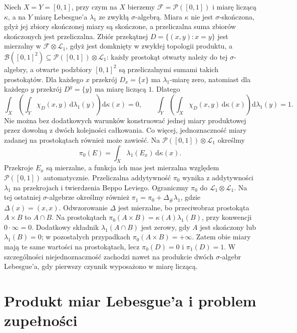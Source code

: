 \begin{przyklad}
\label{ex:non-sigma-tonelli-12}
Niech $X=Y=[0,1]$, przy czym na $X$ bierzemy
$\mathcal F=\mathcal P([0,1])$ i miarę liczącą $\kappa$,
a na $Y$ miarę Lebesgue'a $\lambda_1$ ze zwykłą
$\sigma$-algebrą. Miara $\kappa$ nie jest
$\sigma$-skończona, gdyż jej zbiory skończonej
miary są skończone, a przeliczalna suma zbiorów
skończonych jest przeliczalna.
Zbiór przekątnej $D=\{(x,y):x=y\}$ jest
mierzalny w $\mathcal F\otimes\mathcal L_1$,
gdyż jest domknięty w zwykłej topologii produktu,
a $\mathcal B([0,1]^2)\subseteq\mathcal P([0,1])\otimes\mathcal L_1$:
każdy prostokąt otwarty należy do tej $\sigma$-algebry,
a otwarte podzbiory $[0,1]^2$ są przeliczalnymi sumami
takich prostokątów.
Dla każdego $x$ przekrój $D_x=\{x\}$ ma
$\lambda_1$-miarę zero, natomiast dla każdego $y$
przekrój $D^y=\{y\}$ ma miarę liczącą $1$.
Dlatego
\[
\int_X\left(\int_Y\chi_D(x,y)\,
\mathrm d\lambda_1(y)\right)\mathrm d\kappa(x)=0,
\qquad
\int_Y\left(\int_X\chi_D(x,y)\,
\mathrm d\kappa(x)\right)\mathrm d\lambda_1(y)=1.
\]
Nie można bez dodatkowych warunków konstruować
jednej miary produktowej przez dowolną z dwóch
kolejności całkowania. Co więcej, jednoznaczność
miary zadanej na prostokątach również może zawieść.
Na $\mathcal P([0,1])\otimes\mathcal L_1$ określmy
\[
 \pi_0(E)=\int_X\lambda_1(E_x)\,\mathrm d\kappa(x).
\]
Przekroje $E_x$ są mierzalne, a funkcja ich mas jest
mierzalna względem $\mathcal P([0,1])$ automatycznie.
Przeliczalna addytywność $\pi_0$ wynika z addytywności
$\lambda_1$ na przekrojach i twierdzenia Beppo Leviego.
Ograniczmy $\pi_0$ do $\mathcal L_1\otimes\mathcal L_1$.
Na tej ostatniej $\sigma$-algebrze określmy również
$\pi_1=\pi_0+\Delta_\#\lambda_1$, gdzie $\Delta(x)=(x,x)$.
Odwzorowanie $\Delta$ jest mierzalne, bo przeciwobraz
prostokąta $A\times B$ to $A\cap B$.
Na prostokątach $\pi_0(A\times B)=\kappa(A)\lambda_1(B)$,
przy konwencji $0\cdot\infty=0$.
Dodatkowy składnik $\lambda_1(A\cap B)$ jest zerowy,
gdy $A$ jest skończony lub $\lambda_1(B)=0$;
w pozostałych przypadkach $\pi_0(A\times B)=+\infty$.
Zatem obie miary mają te same wartości na prostokątach,
lecz $\pi_0(D)=0$ i $\pi_1(D)=1$.
W szczególności niejednoznaczność zachodzi nawet
na produkcie dwóch $\sigma$-algebr Lebesgue'a,
gdy pierwszy czynnik wyposażono w miarę liczącą.
\end{przyklad}

\section{Produkt miar Lebesgue'a i problem zupełności}

